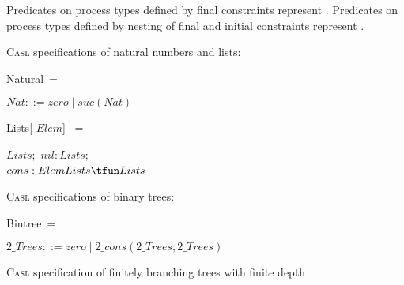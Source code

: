 \documentclass[landscape, autoslides, light]{mmiss}
\newcommand{\CASL}{\textmd{\textsc{Casl}}\xspace }
\begin{document}
\begin{Package}[Label={FSDPT}, Title={Formal Specification of Data and Process Types}, ShortTitle={FSDPT}, Authors={Horst Reichel}, Date={February 2003}, LevelOfDetail=Lecture, Language=en-GB]
\begin{Section}[Title={Summary}, Label={section5}]
\begin{Paragraph}[Title={Nesting of Process and Data Types}, Label=Paragraph154]
\begin{List}[ListType=itemize]
    \ListItem Predicates on process types defined by final
    constraints represent . \pause
    \ListItem Predicates on process types defined by nesting of final
    and initial constraints represent .
\end{List}


\end{Paragraph}
\end{Section}

\begin{Section}[Title={\CASL specifications}, Label={section7}]

\begin{Paragraph}[Label=Paragraph155]
\hypertarget{nat-casl}{\CASL specifications of natural numbers and
lists:}\pause
\begin{SpecDefn}{Natural}~= \item[\Free~ \Type] \(Nat ::= zero \;| \;
suc(Nat)\) \End \end{SpecDefn}\pause \vfill
\begin{SpecDefn}{Lists}[\Sort \hspace{1pt} \(Elem\)] ~=
 \item[\Free~\Group]
\begin{Items}
\I\Sort \(Lists;\) \I\Ops \(nil : Lists; \)
\\ \( cons : Elem \* Lists \tfun Lists \)
 ~\EndGroup \end{Items}  \item[\End]
\end{SpecDefn}

\end{Paragraph}
\begin{Paragraph}[Label=Paragraph156]
\hypertarget{2-trees}{\CASL specifications of binary trees:}\pause
\begin{SpecDefn}{Bintree}~= \item[\Free~ \Type] \(2\_Trees ::= zero \;| \;
2\_cons(2\_Trees, 2\_Trees)\) \End \end{SpecDefn}

\end{Paragraph}
\begin{Paragraph}[Label=Paragraph157]
\hypertarget{trees}{\CASL specification of finitely branching
trees with finite depth}


\end{Paragraph}
\end{Section}
\end{Package}
\end{document}
